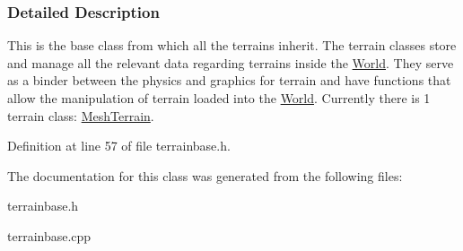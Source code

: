 \subsubsection{Detailed Description}
This is the base class from which all the terrains inherit. The terrain classes store and manage all the relevant data regarding terrains inside the \hyperlink{classMezzanine_1_1World}{World}. They serve as a binder between the physics and graphics for terrain and have functions that allow the manipulation of terrain loaded into the \hyperlink{classMezzanine_1_1World}{World}. Currently there is 1 terrain class: \hyperlink{classMezzanine_1_1MeshTerrain}{MeshTerrain}. 

Definition at line 57 of file terrainbase.h.



The documentation for this class was generated from the following files:\begin{DoxyCompactItemize}
\item 
terrainbase.h\item 
terrainbase.cpp\end{DoxyCompactItemize}
